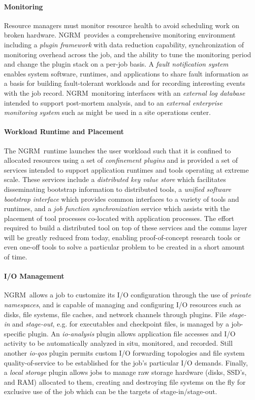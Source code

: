 \documentclass[10pt]{article}
\newcommand{\ngrm}{NGRM}
\begin{document}
\paragraph{Monitoring}
Resource managers must monitor resource health to avoid scheduling
work on broken hardware.  \ngrm\ provides a comprehensive monitoring
environment including a {\em plugin framework} with data reduction
capability, synchronization of monitoring overhead across the job,
and the ability to tune the monitoring period and change the plugin
stack on a per-job basis.
A {\em fault notification system} enables system software, runtimes, and
applications to share fault information as a basis for building fault-tolerant
workloads and for recording interesting events with the job record.
\ngrm\ monitoring interfaces with an {\em external log database} intended
to support post-mortem analysis, and to
an {\em external enterprise monitoring system} such as might be used in
a site operations center.

\paragraph{Workload Runtime and Placement}
The \ngrm\ runtime launches the user workload such that it is confined
to allocated resources using a set of {\em confinement plugins}
and is provided a set of services intended to support application
runtimes and tools operating at extreme scale.
These services include a {\em distributed key value store} which facilitates
disseminating bootstrap information to distributed tools,
a {\em unified software bootstrap interface} which provides common
interfaces to a variety of tools and runtimes, and
a {\em job function synchronization} service which assists with the placement
of tool processes co-located with application processes.
The effort required to build a distributed tool on top of these services
and the comms layer will be greatly reduced from today, enabling
proof-of-concept research tools or even one-off tools to solve a particular
problem to be created in a short amount of time.

\paragraph{I/O Management}
\ngrm\ allows a job to customize its I/O configuration through the use
of {\em private namespaces}, and is capable of managing and configuring
I/O resources such as disks, file systems, file caches, and network channels
through plugins.
File {\em stage-in} and {\em stage-out}, e.g. for executables and
checkpoint files, is managed by a job-specific plugin.
An {\em io-analysis} plugin allows application file accesses and
I/O activity to be automatically analyzed in situ, monitored, and recorded.
Still another {\em io-qos} plugin permits custom I/O forwarding topologies
and file system quality-of-service to be established for the job's
particular I/O demands.  Finally, a  {\em local storage} plugin allows
jobs to manage raw storage hardware (disks, SSD's, and RAM) allocated
to them, creating and destroying file systems on the fly for exclusive
use of the job which can be the targets of stage-in/stage-out.
\end{document}

